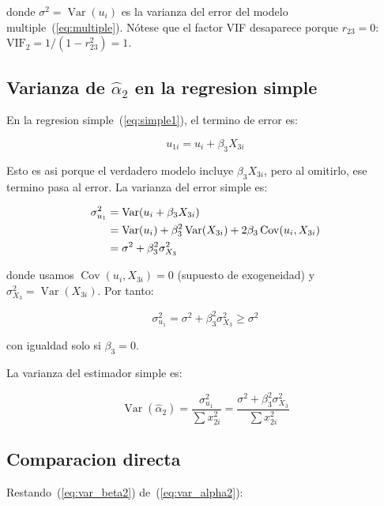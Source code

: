 \documentclass[12pt, letterpaper]{article}
\theoremstyle{remark}
\newcommand{\Var}{\operatorname{Var}}
\newcommand{\Cov}{\operatorname{Cov}}
\begin{document}
donde $\sigma^2 = \Var(u_i)$ es la varianza del error del modelo
multiple~(\ref{eq:multiple}). Nótese que el factor VIF desaparece porque
$r_{23} = 0$: $\text{VIF}_2 = 1/(1 - r_{23}^2) = 1$.

\subsection{Varianza de \texorpdfstring{$\hat\alpha_2$}{alpha2} en la regresion simple}

En la regresion simple~(\ref{eq:simple1}), el termino de error es:

\begin{equation}
  u_{1i} = u_i + \beta_3 X_{3i}
  \label{eq:error_simple}
\end{equation}

Esto es asi porque el verdadero modelo incluye $\beta_3 X_{3i}$, pero al
omitirlo, ese termino pasa al error. La varianza del error simple es:

\begin{align}
  \sigma_{u_1}^2
    &= \Var(u_i + \beta_3 X_{3i})
  \notag\\
    &= \Var(u_i) + \beta_3^2 \Var(X_{3i}) + 2\beta_3 \Cov(u_i, X_{3i})
  \notag\\
    &= \sigma^2 + \beta_3^2 \sigma_{X_3}^2
  \label{eq:var_error_simple}
\end{align}

donde usamos $\Cov(u_i, X_{3i}) = 0$ (supuesto de exogeneidad) y
$\sigma_{X_3}^2 = \Var(X_{3i})$. Por tanto:

\begin{equation}
  \sigma_{u_1}^2 = \sigma^2 + \beta_3^2 \sigma_{X_3}^2 \geq \sigma^2
  \label{eq:desigualdad_var}
\end{equation}

con igualdad solo si $\beta_3 = 0$.

La varianza del estimador simple es:

\begin{equation}
  \Var(\hat\alpha_2)
    = \frac{\sigma_{u_1}^2}{\sum x_{2i}^2}
    = \frac{\sigma^2 + \beta_3^2 \sigma_{X_3}^2}{\sum x_{2i}^2}
  \label{eq:var_alpha2}
\end{equation}

\subsection{Comparacion directa}

Restando~(\ref{eq:var_beta2}) de~(\ref{eq:var_alpha2}):
\end{document}
